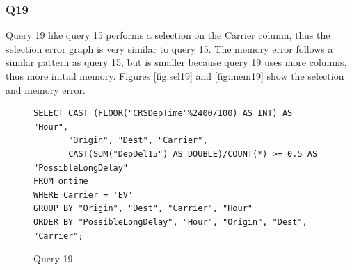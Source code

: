 \subsubsection{Q19}
Query 19 like query 15 performs a selection on the Carrier column, thus
the selection error graph is very similar to query 15. The memory error
follows a similar pattern as query 15, but is smaller because query 19 uses
more columns, thus more initial memory.
Figures \ref{fig:sel19} and \ref{fig:mem19} show the selection and memory error.

\begin{figure}[htb!]
\begin{lstlisting}[frame=single]
SELECT CAST (FLOOR("CRSDepTime"%2400/100) AS INT) AS "Hour",
       "Origin", "Dest", "Carrier",
       CAST(SUM("DepDel15") AS DOUBLE)/COUNT(*) >= 0.5 AS "PossibleLongDelay"
FROM ontime
WHERE Carrier = 'EV'
GROUP BY "Origin", "Dest", "Carrier", "Hour"
ORDER BY "PossibleLongDelay", "Hour", "Origin", "Dest", "Carrier";
\end{lstlisting}
  \caption{Query 19}
  \label{sel:sql19}
\end{figure}


